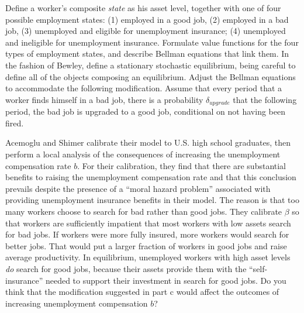 Define a worker's composite {\it state\/} as his asset level, together with
one of four possible employment states: (1) employed in a good job, (2)
employed in a bad job,
 (3) unemployed and eligible for unemployment insurance;
 (4) unemployed and ineligible for unemployment insurance.
\medskip
{}  Formulate value functions for the four types
of employment states, and
describe Bellman equations that link them.
\medskip
{}  In the fashion of Bewley,
define a  stationary   stochastic equilibrium, being careful to define
all of the objects composing an equilibrium.
\medskip
{}   Adjust the Bellman equations to accommodate
the following modification.  Assume that every period that a worker
finds himself in a bad job, there is a probability $\delta_{upgrade}$
that the following period, the bad job is upgraded to a good job,
conditional on not having been fired.

\medskip
{}  Acemoglu and Shimer calibrate their model
to U.S. high school graduates, then perform a local analysis of
the consequences of increasing the unemployment compensation rate $b$.
For their calibration, they find that there are substantial benefits
to raising the unemployment compensation rate and that this conclusion
prevails despite the presence of a ``moral hazard problem'' associated
with providing unemployment insurance benefits in their model.  The reason is that too
many workers choose to search for bad rather than good jobs.  They calibrate
$\beta$ so that  workers are sufficiently impatient that most workers
with low assets search for bad jobs.  If workers were more fully insured,
more workers would search for better jobs. That would put a larger fraction
of workers in good jobs and  raise average productivity.  In equilibrium,
unemployed workers with high asset levels {\it do\/} search for good jobs,
because their assets provide them with the ``self-insurance'' needed to
support their investment in search for good jobs.  Do you think that
the modification suggested in part c would affect the outcomes
of increasing unemployment compensation $b$?


